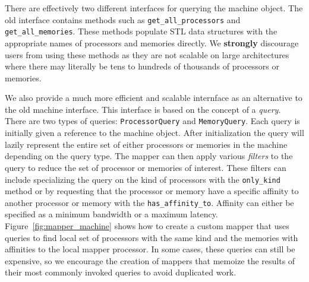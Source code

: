 There are effectively two different interfaces for querying the machine
object. The old interface contains methods such as {\tt get\_all\_processors}
and {\tt get\_all\_memories}. These methods populate STL data structures
with the appropriate names of processors and memories directly. We {\bf strongly}
discourage users from using these methods as they are not scalable on large
architectures where there may literally be tens to hundreds of thousands of
processors or memories.

We also provide a much more efficient and scalable internface as an alternative
to the old machine interface. This interface is based on the concept of a 
{\em query}. There are two types of queries: {\tt ProcessorQuery} and 
{\tt MemoryQuery}. Each query is initially given a reference to the machine
object. After initialization the query will lazily represent the entire set of 
either processors or memories in the machine depending on the query type.
The mapper can then apply various {\em filters} to the query to reduce the
set of processor or memories of interest.  These filters can include specializing
the query on the kind of processors with the {\tt only\_kind} method or by
requesting that the processor or memory have a specific affinity to another
processor or memory with the {\tt has\_affinity\_to}. Affinity can either be
specified as a minimum bandwidth or a maximum latency. Figure~\ref{fig:mapper_machine}
shows how to create a custom mapper that uses queries to find local set of 
processors with the same kind and the memories with affinities to the local
mapper processor. In some cases, these queries can still be expensive, so we
encourage the creation of mappers that memoize the results of their most 
commonly invoked queries to avoid duplicated work.


